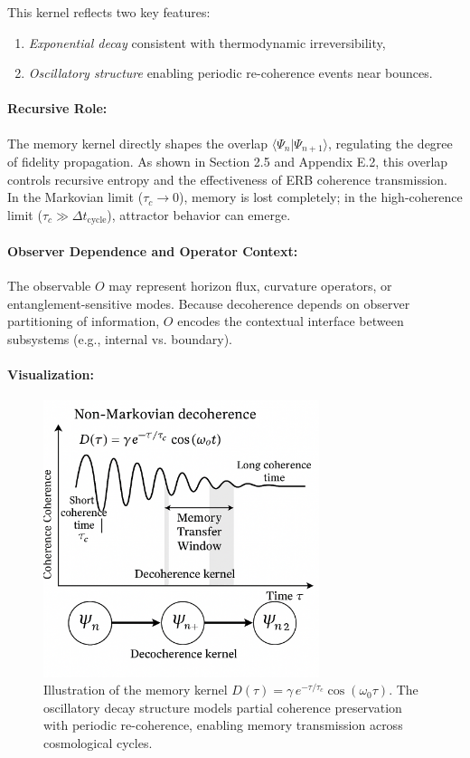 This kernel reflects two key features:
\begin{enumerate}
    \item \textit{Exponential decay} consistent with thermodynamic irreversibility,
    \item \textit{Oscillatory structure} enabling periodic re-coherence events near bounces.
\end{enumerate}

\paragraph{Recursive Role:}

The memory kernel directly shapes the overlap \( \langle \Psi_n | \Psi_{n+1} \rangle \), regulating the degree of fidelity propagation. As shown in Section 2.5 and Appendix E.2, this overlap controls recursive entropy and the effectiveness of ERB coherence transmission. In the Markovian limit (\( \tau_c \to 0 \)), memory is lost completely; in the high-coherence limit (\( \tau_c \gg \Delta t_{\text{cycle}} \)), attractor behavior can emerge.

\paragraph{Observer Dependence and Operator Context:}

The observable \( O \) may represent horizon flux, curvature operators, or entanglement-sensitive modes. Because decoherence depends on observer partitioning of information, \( O \) encodes the contextual interface between subsystems (e.g., internal vs. boundary).

\paragraph{Visualization:}

\begin{figure}[H]
\centering
\includegraphics[width=0.72\textwidth]{figures/non_markovian_memory_kernel.png}
\caption{Illustration of the memory kernel \( D(\tau) = \gamma \, e^{-\tau/\tau_c} \cos(\omega_0 \tau) \). The oscillatory decay structure models partial coherence preservation with periodic re-coherence, enabling memory transmission across cosmological cycles.}
\label{fig:memory_kernel}
\end{figure}

